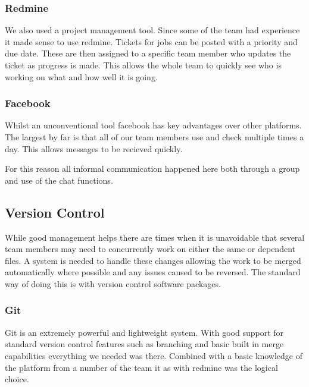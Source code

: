 \subsubsection*{Redmine}

We also used a project management tool. Since some of the team had
experience it made sense to use redmine. Tickets for jobs can be posted
with a priority and due date. These are then assigned to a specific
team member who updates the ticket as progress is made. This allows
the whole team to quickly see who is working on what and how well
it is going.


\subsubsection*{Facebook}

Whilst an unconventional tool facebook has key advantages over other
platforms. The largest by far is that all of our team members use
and check multiple times a day. This allows messages to be recieved
quickly.

For this reason all informal communication happened here both through
a group and use of the chat functions.


\subsection*{Version Control}

While good management helps there are times when it is unavoidable
that several team members may need to concurrently work on either
the same or dependent files. A system is needed to handle these changes
allowing the work to be merged automatically where possible and any
issues caused to be reversed. The standard way of doing this is with
version control software packages.


\subsubsection*{Git}

Git is an extremely powerful and lightweight system. With good support
for standard version control features such as branching and basic
built in merge capabilities everything we needed was there. Combined
with a basic knowledge of the platform from a number of the team it
as with redmine was the logical choice.





